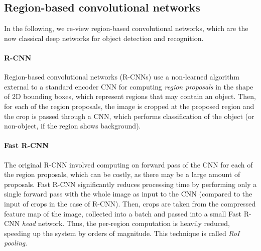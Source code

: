 


\subsection{Region-based convolutional networks}
In the following, we re-view region-based convolutional networks, which are the now classical deep networks for
object detection and recognition.

\paragraph{R-CNN}
Region-based convolutional networks (R-CNNs) use a non-learned algorithm external to a standard encoder CNN
for computing \emph{region proposals} in the shape of 2D bounding boxes, which represent regions that may contain an object.
Then, for each of the region proposals, the image is cropped at the proposed region and the crop is
passed through a CNN, which performs classification of the object (or non-object, if the region shows background).

\paragraph{Fast R-CNN}
The original R-CNN involved computing on forward pass of the CNN for each of the region proposals,
which can be costly, as there may be a large amount of proposals.
Fast R-CNN significantly reduces processing time by performing only a single forward pass with the whole image
as input to the CNN (compared to the input of crops in the case of R-CNN).
Then, crops are taken from the compressed feature map of the image, collected into a batch and passed into a small Fast R-CNN
\emph{head} network.
Thus, the per-region computation is heavily reduced, speeding up the system by orders of magnitude. %
This technique is called \emph{RoI pooling}.

